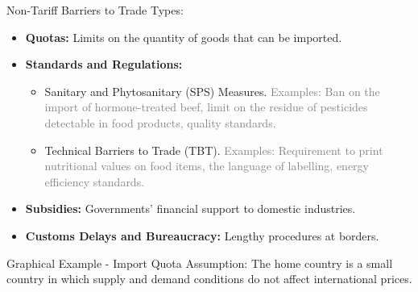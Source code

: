 \documentclass{beamer}
\begin{document}
\begin{frame}{Non-Tariff Barriers to Trade}
Types:
     \begin{itemize} \small
        \item \textbf{Quotas:} Limits on the quantity of goods that can be imported.
        \item \textbf{Standards and Regulations:}
        \begin{itemize} \footnotesize
            \item Sanitary and Phytosanitary (SPS) Measures. \textcolor{gray}{Examples: Ban on the import of hormone-treated beef, limit on the residue of pesticides detectable in food products, quality standards.}
            \item Technical Barriers to Trade (TBT).  \textcolor{gray}{Examples: Requirement to print nutritional values on food items, the language of labelling, energy efficiency standards.} %
        \end{itemize}
        \item \textbf{Subsidies:} Governments' financial support to domestic industries.
        \item \textbf{Customs Delays and Bureaucracy:} Lengthy procedures at borders. %
    \end{itemize}
\end{frame}

\begin{frame}[t]{Graphical Example - Import Quota}
\small
    Assumption: The home country is a small country in which supply and demand conditions do not affect international prices.
  
\end{frame}
\end{document}
